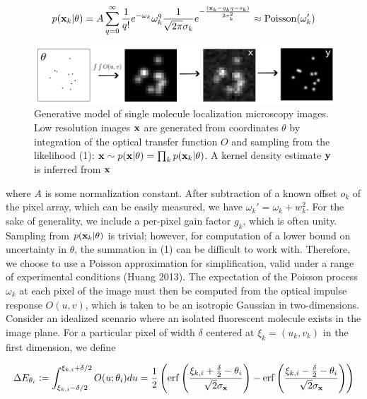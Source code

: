 \documentclass{article}
\begin{document}
\begin{equation}
p(\bold{x}_{k}|\theta) = A\sum_{q=0}^{\infty} \frac{1}{q!}e^{-\omega_{k}}\omega_{k}^{q}\frac{1}{\sqrt{2\pi}\sigma_{k}}e^{-\frac{(\bold{x}_{k}-g_{k}q-o_{k})}{2\sigma_{k}^{2}}} \approx \mathrm{Poisson}(\omega_{k}')
\end{equation}


\begin{figure}
\includegraphics[scale=0.225]{Generation.png}
\caption{Generative model of single molecule localization microscopy images. Low resolution images $\bold{x}$ are generated from coordinates $\theta$ by integration of the optical transfer function $O$ and sampling from the likelihood (1): $\bold{x}\sim p(\bold{x}|\theta) = \prod_{k} p(\bold{x}_k|\theta)$. A kernel density estimate $\bold{y}$ is inferred from $\bold{x}$}
\end{figure}

where $A$ is some normalization constant. After subtraction of a known offset $o_{k}$ of the pixel array, which can be easily measured, we have $\omega_{k}' = \omega_{k} + w_{k}^{2}$. For the sake of generality, we include a per-pixel gain factor $g_{k}$, which is often unity. Sampling from $p(\bold{x}_{k}|\theta)$ is trivial; however, for computation of a lower bound on uncertainty in $\theta$, the summation in (1) can be difficult to work with. Therefore, we choose to use a Poisson approximation for simplification, valid under a range of experimental conditions (Huang 2013). The expectation of the Poisson process $\omega_{k}$ at each pixel of the image must then be computed from the optical impulse response $O(u,v)$, which is taken to be an isotropic Gaussian in two-dimensions. Consider an idealized scenario where an isolated fluorescent molecule exists in the image plane. For a particular pixel of width $\delta$ centered at $\xi_{k}=(u_k,v_k)$ in the first dimension, we define

\begin{equation}
\Delta E_{\theta_{i}} \vcentcolon = \int_{\xi_{k,i}-\delta /2}^{\xi_{k,i}+\delta /2} O(u;\theta_{i})du = \frac{1}{2}\left(\mathrm{erf}\left(\frac{\xi_{k,i}+\frac{\delta}{2}-\theta_{i}}{\sqrt{2}\sigma_{\bold{x}}}\right) -\mathrm{erf}\left(\frac{\xi_{k,i}-\frac{\delta}{2}-\theta_{i}}{\sqrt{2}\sigma_{\bold{x}}}\right)\right)
\end{equation}
\end{document}
